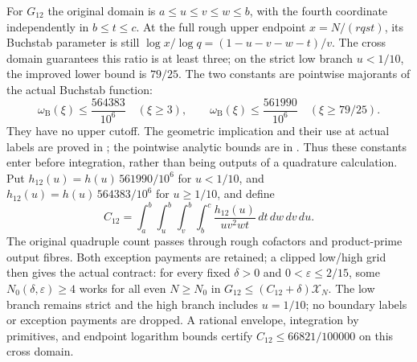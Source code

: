 For $G_{12}$ the original domain is
$a\le u\le v\le w\le b$, with the fourth coordinate independently in
$b\le t\le c$.  At the full rough upper endpoint $x=N/(rqst)$,
its Buchstab parameter is still $\log x/\log q=(1-u-v-w-t)/v$.
The cross domain guarantees this ratio is at least three; on the strict
low branch $u<1/10$, the improved lower bound is $79/25$.
The two constants are pointwise majorants of the actual Buchstab function:
\[
 \omega_{\mathrm B}(\xi)\le\frac{564383}{10^6}\quad(\xi\ge3),
 \qquad
 \omega_{\mathrm B}(\xi)\le\frac{561990}{10^6}\quad(\xi\ge79/25).
\]
They have no upper cutoff.  The geometric implication and their use at
actual labels are proved in
;
the pointwise analytic bounds are in
.
Thus these constants enter before integration, rather than being outputs
of a quadrature calculation.  Put $h_{12}(u)=h(u)\,561990/10^6$ for $u<1/10$, and
$h_{12}(u)=h(u)\,564383/10^6$ for $u\ge1/10$, and define
\[
 C_{12}=\int_a^b\int_u^b\int_v^b\int_b^c
             \frac{h_{12}(u)}{uv^2wt}\,dt\,dw\,dv\,du.
\]
The original quadruple count passes through rough cofactors and
product-prime output fibres.  Both exception payments are retained;
a clipped low/high grid then gives the actual contract: for every fixed
$\delta>0$ and $0<\varepsilon\le2/15$, some
$N_0(\delta,\varepsilon)\ge4$ works for all even $N\ge N_0$ in
$G_{12}\le(C_{12}+\delta)\mathcal X_N$.
The low branch remains strict and the high branch includes $u=1/10$;
no boundary labels or exception payments are dropped.
A rational envelope, integration by primitives, and endpoint logarithm
bounds certify $C_{12}\le66821/100000$ on this cross domain.

